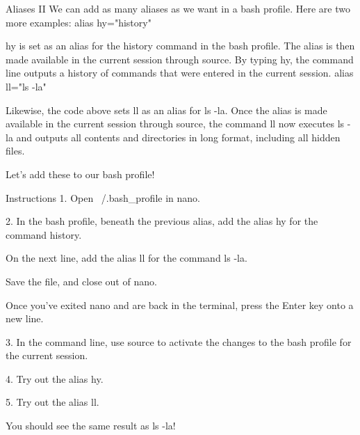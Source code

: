 Aliases II
    We can add as many aliases as we want in a bash profile. Here are two more examples:
        alias hy="history"
    
    hy is set as an alias for the history command in the bash profile. The alias is then made available in the current session through source. By typing hy, the command line outputs a history of commands that were entered in the current session.
        alias ll="ls -la"
    
    Likewise, the code above sets ll as an alias for ls -la. Once the alias is made available in the current session through source, the command ll now executes ls -la and outputs all contents and directories in long format, including all hidden files.

    Let’s add these to our bash profile!

Instructions
    1.
    Open ~/.bash_profile in nano.

    2.
    In the bash profile, beneath the previous alias, add the alias hy for the command history.

    On the next line, add the alias ll for the command ls -la.

    Save the file, and close out of nano.

    Once you’ve exited nano and are back in the terminal, press the Enter key onto a new line.

    3.
    In the command line, use source to activate the changes to the bash profile for the current session.

    4.
    Try out the alias hy.

    5.
    Try out the alias ll.

    You should see the same result as ls -la!